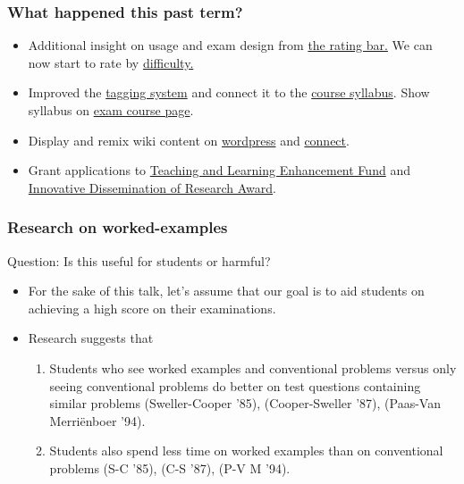 \documentclass{beamer}
\begin{document}
\frame
{
  \frametitle{What happened this past term?}

      \begin{itemize}
            \item Additional insight on usage and exam design from  \href{http://wiki.ubc.ca/Science:Math_Exam_Resources/Courses/MATH105/April_2010/Question_6}{the rating bar.} We can now start to rate by \href{http://wiki.ubc.ca/Sandbox:MER-rating}{difficulty.}
            \item Improved the \href{http://wiki.ubc.ca/Category:MER_Tag_Linear_approximation}{tagging system} and connect it to the  \href{http://www.math.ubc.ca/~cbruni/pdfs/Math103JanApr2014/syllabus.pdf}{course syllabus}. Show syllabus on \href{http://wiki.ubc.ca/Science:Math_Exam_Resources/Courses/MATH103}{exam course page}.
            \item Display and remix wiki content on \href{http://wordpress.org/plugins/wiki-embed/}{wordpress} and \href{http://wiki.ubc.ca/Sandbox:MER_Wiki_to_LMS}{connect}.
            \item Grant applications to \href{http://tlef.ubc.ca/tlef-criteria/}{Teaching and Learning Enhancement Fund} and \href{http://wiki.ubc.ca/Library:Scholarly_Communications/Innovative_Dissemination_of_Research_Award}{Innovative Dissemination of Research Award}.

\end{itemize}
}




\frame
{
  \frametitle{Research on worked-examples}

\alert{Question:} Is this useful for students or harmful?\\

      \begin{itemize}
            \item For the sake of this talk, let's assume that our goal is to aid students on achieving a high score on their examinations.
            \item Research suggests that
            \begin{enumerate}
            \item Students who see worked examples and conventional problems versus only seeing conventional problems do better on test questions containing similar problems (Sweller-Cooper '85), (Cooper-Sweller '87), (Paas-Van Merri\"enboer '94).
            \item Students also spend less time on worked examples than on conventional problems (S-C '85), (C-S '87), (P-V M '94).
            \end{enumerate}
      \end{itemize}
}
\end{document}
